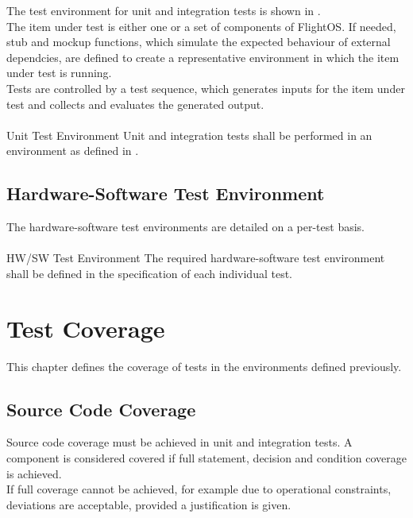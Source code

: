 The test environment for unit and integration tests is shown in
.\\

\noindent
The item under test is either one or a set of components of FlightOS. If needed,
stub and mockup functions, which simulate the expected behaviour of external
dependcies, are defined to create a representative environment in which the item
under test is running.\\

\noindent
Tests are controlled by a test sequence, which generates inputs for the item
under test and collects and evaluates the generated output.\\
\\

 {Unit Test Environment}{%
Unit and integration tests shall be performed in an environment as defined in %
. %
}{}%


\section{Hardware-Software Test Environment}

The hardware-software test environments are detailed on a per-test basis.\\
\\

 {HW/SW Test Environment}{%
The required hardware-software test environment shall be defined in the %
specification of each individual test.%
}{}%

\chapter{Test Coverage}

This chapter defines the coverage of tests in the environments defined
previously.


\section{Source Code Coverage}

Source code coverage must be achieved in unit and integration tests.
A component is considered covered if full statement, decision and condition
coverage is achieved. \\

\noindent
If full coverage cannot be achieved, for example due to operational constraints,
deviations are acceptable, provided a justification is given.\\
\\

